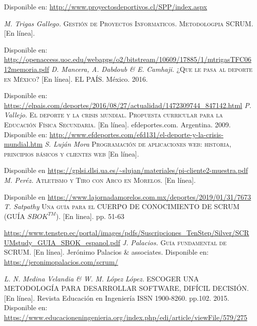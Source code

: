 \begin{thebibliography}{}
	Disponible en:
	\url{http://www.proyectosdeportivos.cl/SPP/index.aspx}
	
	\textit{M. Trigas Gallego.}
	\textsc{Gestión de Proyectos Informaticos. Metodologpia SCRUM.} [En línea].
	
	Disponible en: 
	\url{http://openaccess.uoc.edu/webapps/o2/bitstream/10609/17885/1/mtrigasTFC0612memoria.pdf}	
	\textit{D. Mancera, A. Dabdoub \& E. Camhaji.}
	\textsc{¿Que le pasa al deporte en México?} [En línea].
	EL PAÍS. México. 2016.
	
	Disponible en: 
	\url{https://elpais.com/deportes/2016/08/27/actualidad/1472309744_847142.html}	
	\textit{P. Vallejo.}
	\textsc{El deporte y la crisis mundial. Propuesta curricular para la Educación Física Secundaria.} [En línea]. 
	efdeportes.com. Argentina. 2009.
	Disponible en: 
	\url{http://www.efdeportes.com/efd131/el-deporte-y-la-crisis-mundial.htm}
	\textit{S. Luján Mora}
	\textsc{Programación de aplicaciones web: historia, principios básicos y clientes web} [En línea].
	
	Disponible en 
	\url{https://gplsi.dlsi.ua.es/~slujan/materiales/pi-cliente2-muestra.pdf}
	\textit{M. Peréz.}
	\textsc{Atletismo y Tiro con Arco en Morelos.} [En línea].
	
	Disponible en 
	\url{https://www.lajornadamorelos.com.mx/deportes/2019/01/31/7673}
	\textit{T. Satpathy}
	\textsc{Una guía para el CUERPO DE CONOCIMIENTO DE SCRUM (GUÍA $SBOK^{TM}$).} [En linea]. pp. 51-63 
	
	\url{https://www.tenstep.ec/portal/images/pdfs/Suscripciones_TenStep/Silver/SCRUMstudy_GUIA_SBOK_espanol.pdf}
	\textit{J. Palacios.}
	\textsc{Guía fundamental de SCRUM.} [En línea]. 
	Jerónimo Palacios \& associates. 
	Disponible en: 
	\url{https://jeronimopalacios.com/scrum/}
	
	\textit{L. N. Medina Velandia \& W. M. López López.}
	\textsc{ESCOGER UNA METODOLOGÍA PARA DESARROLLAR SOFTWARE, DIFÍCIL DECISIÓN.} [En línea]. 
	Revista Educación en Ingeniería ISSN 1900-8260. pp.102. 2015. 
	Disponible en: 
	\url{https://www.educacioneningenieria.org/index.php/edi/article/viewFile/579/275}
	

\end{thebibliography}
